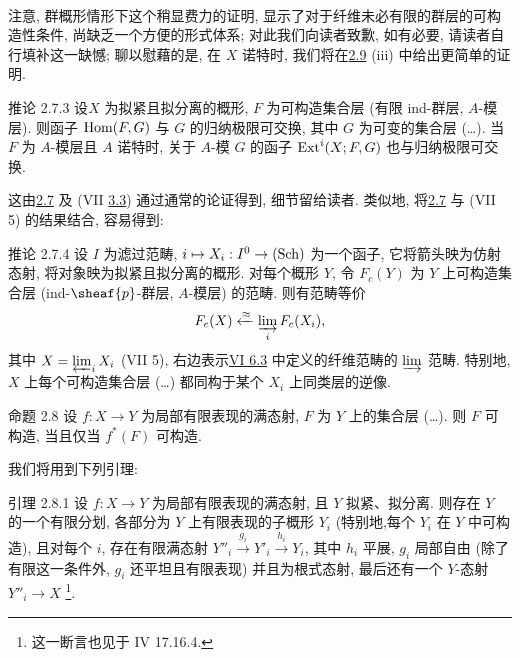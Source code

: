 \setcounter{subsection}{7}
\setcounter{subsubsection}{2}
\paragraph{}
注意, 群概形情形下这个稍显费力的证明,
显示了对于纤维未必有限的群层的可构造性条件, 尚缺乏一个方便的形式体系;
对此我们向读者致歉, 如有必要, 请读者自行填补这一缺憾;
聊以慰藉的是, 在 $X$ 诺特时, 我们将在\hyperref[IX.prop2.9]{2.9} (iii) 中给出更简单的证明.

\begin{enonce*}{推论 2.7.3}
设\pageoriginale $X$ 为拟紧且拟分离的概形,
$F$ 为可构造集合层 (\resp 有限 ind-群层, \resp $A$-模层).
则函子 $\operatorname{Hom}(F,G)$ 与 $G$ 的归纳极限可交换,
其中 $G$ 为可变的集合层 (\resp\ldots).
当 $F$ 为 $A$-模层且 $A$ 诺特时,
关于 $A$-模 $G$ 的函子 $\operatorname{Ext}^{i}(X;F,G)$ 也与归纳极限可交换.
\end{enonce*}

这由\hyperref[IX.prop2.7]{2.7} 及 (VII \hyperref[VII.prop3.3]{3.3})
通过通常的论证得到, 细节留给读者.
类似地, 将\hyperref[IX.prop2.7]{2.7} 与 (VII 5) 的结果结合, 容易得到:

\begin{enonce*}{推论 2.7.4}
设 $I$ 为滤过范畴, $i\mapsto
X_i:I^0\rightarrow (\operatorname{Sch})$ 为一个函子,
它将箭头映为仿射态射, 将对象映为拟紧且拟分离的概形.
对每个概形 $Y$, 令 $F_{c}(Y)$ 为 $Y$ 上可构造集合层
(\resp ind-$\sheaf{p}$-群层, \resp $A$-模层) 的范畴.
则有范畴等价
$$
F_{c}(X)\xleftarrow{\approx}\varinjlim_i F_{c}(X_i){},
$$
其中 $X=\varprojlim_i X_i$ {\rm (VII 5)},
右边表示\hyperref[VI.def6.3]{VI 6.3} 中定义的纤维范畴的 $\varinjlim$ 范畴.
特别地, $X$ 上每个可构造集合层 (\resp\ldots)
都同构于某个 $X_i$ 上同类层的逆像.
\end{enonce*}

\begin{enonce*}{命题 2.8}
设 $f:X\rightarrow Y$ 为局部有限表现的满态射,
$F$ 为 $Y$ 上的集合层 (\resp\ldots).
则 $F$ 可构造, 当且仅当 $f^{\ast}(F)$ 可构造.
\end{enonce*}

我们将用到下列引理:

\begin{enonce*}{引理 2.8.1}
设 $f:X\rightarrow Y$ 为局部有限表现的满态射,
且 $Y$ 拟紧、拟分离.
则存在 $Y$ 的一个有限分划, 各部分为 $Y$ 上有限表现的子概形 $Y_i$
(特别地,\pageoriginale 每个 $Y_i$ 在 $Y$ 中可构造),
且对每个 $i$, 存在有限满态射 $Y''_i\xrightarrow{g_i}Y'_i\xrightarrow{h_i}Y_i$,
其中 $h_i$ 平展, $g_i$ 局部自由
(\ie 除了有限这一条件外, $g_i$ 还平坦且有限表现) 并且为根式态射,
最后还有一个 $Y$-态射 $Y''_i\rightarrow X$
\footnote[1]{这一断言也见于 \EGA IV 17.16.4.}.
\end{enonce*}

